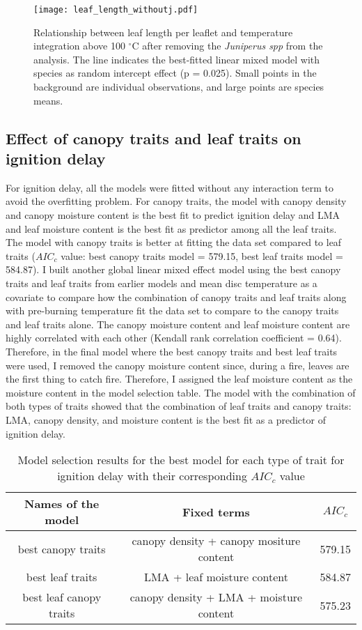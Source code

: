 \documentclass[12pt]{report}
\begin{document}
\begin{figure}
    \centering
    \texttt{[image: leaf\_length\_withoutj.pdf]}
    \caption{Relationship between leaf length per leaflet and temperature integration above 100 $^{\circ}$C after removing the \emph{Juniperus spp} from the analysis. The line indicates the best-fitted linear mixed model with species as random intercept effect (p = 0.025). Small points in the background are individual observations, and large points are species means.}
\end{figure}



\subsection{Effect of canopy traits and leaf traits on ignition delay}

For ignition delay, all the models were fitted without any interaction term to avoid the overfitting problem. For canopy traits, the model with canopy density and canopy moisture content is the best fit to predict ignition delay and LMA and leaf moisture content is the best fit as predictor among all the leaf traits. The model with canopy traits is better at fitting the data set compared to leaf traits ($AIC_{c}$ value: best canopy traits model = 579.15, best leaf traits model = 584.87). I built another global linear mixed effect model using the best canopy traits and leaf traits from earlier models and mean disc temperature as a covariate to compare how the combination of canopy traits and leaf traits along with pre-burning temperature fit the data set to compare to the canopy traits and leaf traits alone. The canopy moisture content and leaf moisture content are highly correlated with each other (Kendall rank correlation coefficient = 0.64). Therefore, in the final model where the best canopy traits and best leaf traits were used, I removed the canopy moisture content since, during a fire, leaves are the first thing to catch fire. Therefore, I assigned the leaf moisture content as the moisture content in the model selection table. The model with the combination of both types of traits showed that the combination of leaf traits and canopy traits: LMA, canopy density, and moisture content is the best fit as a predictor of ignition delay.

\begin{table}
\centering
\begin{tabular}{|c | c | c|}
       \hline
       \textbf{Names of the model} & \textbf{Fixed terms} & \textbf{$AIC_{c}$} \\
       \hline
       best canopy traits  & canopy density + canopy mositure content & 579.15 \\
       \hline
       best leaf traits    & LMA + leaf moisture content & 584.87 \\
       \hline
       best leaf canopy traits   & canopy density + LMA + moisture content & 575.23\\
       \hline
\end{tabular}
\caption{Model selection results for the best model for each type of trait for ignition delay with their corresponding $AIC_{c}$ value}
\end{table} 
\end{document}

